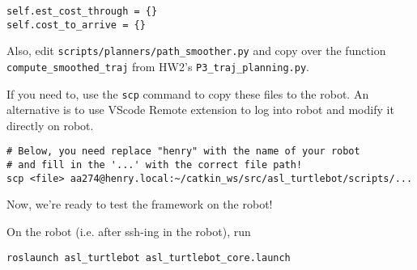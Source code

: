 \documentclass{article}
\begin{document}
\begin{lstlisting}
self.est_cost_through = {}
self.cost_to_arrive = {}
\end{lstlisting}

Also, edit \texttt{scripts/planners/path\_smoother.py} and copy over the function \texttt{compute\_smoothed\_traj} from HW2's \texttt{P3\_traj\_planning.py}.

If you need to, use the \texttt{scp} command to copy these files to the robot. An alternative is to use VScode Remote extension to log into robot and modify it directly on robot.


\begin{lstlisting}
# Below, you need replace "henry" with the name of your robot 
# and fill in the '...' with the correct file path!
scp <file> aa274@henry.local:~/catkin_ws/src/asl_turtlebot/scripts/...
\end{lstlisting}

Now, we're ready to test the framework on the robot!




On the robot (i.e. after ssh-ing in the robot), run

\begin{lstlisting}
roslaunch asl_turtlebot asl_turtlebot_core.launch
\end{lstlisting}
\end{document}
